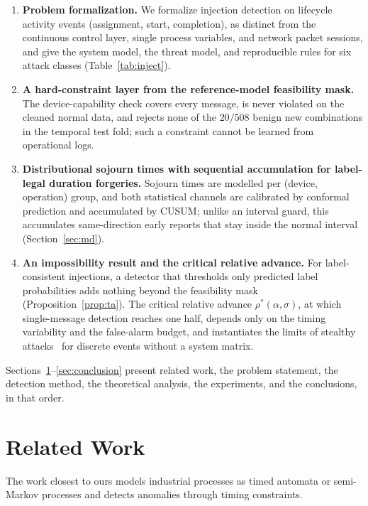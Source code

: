 \documentclass[manuscript,screen,review]{acmart}
\begin{document}
\begin{enumerate}
\item \textbf{Problem formalization.} We formalize injection detection on lifecycle activity events (assignment, start, completion), as distinct from the continuous control layer, single process variables, and network packet sessions, and give the system model, the threat model, and reproducible rules for six attack classes (Table~\ref{tab:inject}).
\item \textbf{A hard-constraint layer from the reference-model feasibility mask.} The device-capability check covers every message, is never violated on the cleaned normal data, and rejects none of the $20/508$ benign new combinations in the temporal test fold; such a constraint cannot be learned from operational logs.
\item \textbf{Distributional sojourn times with sequential accumulation for label-legal duration forgeries.} Sojourn times are modelled per (device, operation) group, and both statistical channels are calibrated by conformal prediction and accumulated by {CUSUM}; unlike an interval guard, this accumulates same-direction early reports that stay inside the normal interval (Section~\ref{sec:md}).
\item \textbf{An impossibility result and the critical relative advance.} For label-consistent injections, a detector that thresholds only predicted label probabilities adds nothing beyond the feasibility mask (Proposition~\ref{prop:ta}). The critical relative advance $\rho^*(\alpha,\sigma)$, at which single-message detection reaches one half, depends only on the timing variability and the false-alarm budget, and instantiates the limits of stealthy attacks~\cite{liu2022limits} for discrete events without a system matrix.
\end{enumerate}

Sections~\ref{sec:related}--\ref{sec:conclusion} present related work, the problem statement, the detection method, the theoretical analysis, the experiments, and the conclusions, in that order.

\section{Related Work}
\label{sec:related}

The work closest to ours models industrial processes as timed automata or semi-Markov processes and detects anomalies through timing constraints.
\end{document}
